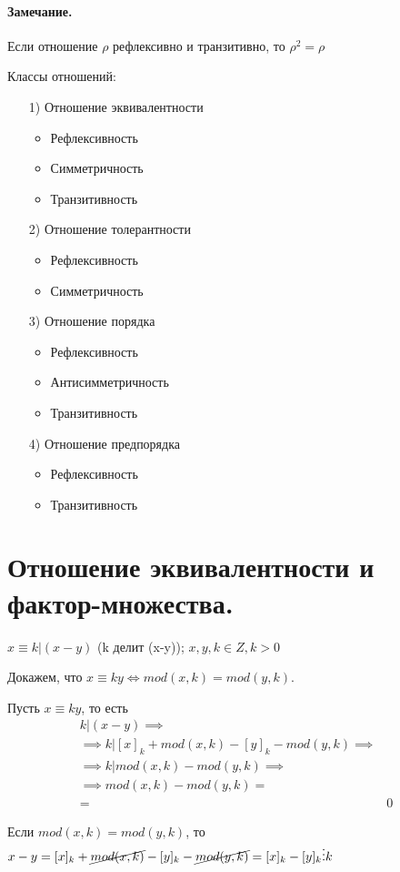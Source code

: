 \paragraph*{Замечание.}
Если отношение $\rho$ рефлексивно и транзитивно, то  $\rho^2  = \rho$


\medskip

Классы отношений:
\begin{itemize}
	\item[1)] Отношение эквивалентности
		\begin{itemize}
			\item Рефлексивность
			\item Симметричность
			\item Транзитивность
		\end{itemize}
	\item[2)] Отношение толерантности
		\begin{itemize}
			\item Рефлексивность
			\item Симметричность
		\end{itemize}
	\item[3)] Отношение порядка
		\begin{itemize}
			\item Рефлексивность
			\item Антисимметричность
			\item Транзитивность
		\end{itemize}
	\item[4)] Отношение предпорядка
		\begin{itemize}
			\item Рефлексивность
			\item Транзитивность
		\end{itemize}
\end{itemize}

\section{Отношение эквивалентности и фактор-множества.}
$x \equiv k|(x-y)$ (k делит (x-y));  $x,y,k \in Z, k > 0$

Докажем, что $x \equiv ky \Longleftrightarrow mod(x,k)=mod(y,k)$.

\begin{myproof}
Пусть $x \equiv ky$, то есть
\begin{align*}
	k | (x-y) \implies& \\
	\implies k | [x]_k + mod(x,k) - [y]_k - mod(y,k) \implies& \\
	\implies k | mod(x,k) - mod(y,k) \implies& \\
	\implies mod(x,k)-mod(y,k) =& \\
	=& 0
\end{align*}

Если $mod(x,k) = mod(y,k)$, то  $x - y = [x]_k + \cancel{mod(x,k)} - [y]_k - \cancel{mod(y,k)}
= [x]_k - [y]_k \vdots k$
\end{myproof}

